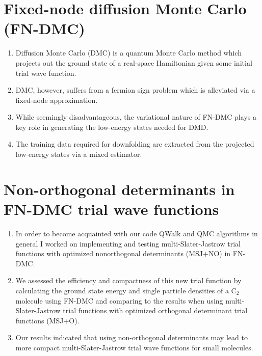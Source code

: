 \documentclass{article}
\begin{document}
\section{Fixed-node diffusion Monte Carlo (FN-DMC)}
\begin{enumerate}
\item Diffusion Monte Carlo (DMC) is a quantum Monte Carlo method which projects out the ground state of a real-space Hamiltonian given some initial trial wave function.

\item DMC, however, suffers from a fermion sign problem which is alleviated via a fixed-node approximation.

\item While seemingly disadvantageous, the variational nature of FN-DMC plays a key role in generating the low-energy states needed for DMD.  

\item The training data required for downfolding are extracted from the projected low-energy states via a mixed estimator.
\end{enumerate}

\section{Non-orthogonal determinants in FN-DMC trial wave functions}
\begin{enumerate}
\item In order to become acquainted with our code QWalk and QMC algorithms in general I worked on implementing and testing multi-Slater-Jastrow trial functions with optimized nonorthogonal determinants (MSJ+NO) in FN-DMC.

\item We assessed the efficiency and compactness of this new trial function by calculating the ground state energy and single particle densities of a C$_2$ molecule using FN-DMC and comparing to the results when using multi-Slater-Jastrow trial functions with optimized orthogonal determinant trial functions (MSJ+O).

\item Our results indicated that using non-orthogonal determinants may
lead to more compact multi-Slater-Jastrow trial wave functions for small molecules.
\end{enumerate}
\end{document}
